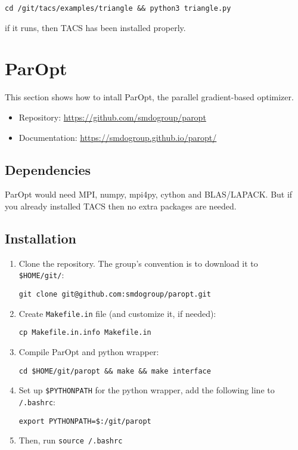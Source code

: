 \documentclass{article}
\begin{document}
\texttt{cd \texttildelow/git/tacs/examples/triangle \&\& python3 triangle.py}

if it runs, then TACS has been installed properly.

\section{ParOpt}

This section shows how to intall ParOpt, the parallel gradient-based optimizer.

\begin{itemize}
    \item Repository: \href{https://github.com/smdogroup/paropt}{https://github.com/smdogroup/paropt}
    \item Documentation: \href{https://smdogroup.github.io/paropt/}{https://smdogroup.github.io/paropt/}
\end{itemize}

\subsection{Dependencies}

ParOpt would need MPI, numpy, mpi4py, cython and BLAS/LAPACK. But if you already
installed TACS then no extra packages are needed.

\subsection{Installation}

\begin{enumerate}

    \item Clone the repository. The group's convention is to download it to
    \texttt{\$HOME/git/}:

    \texttt{git clone git@github.com:smdogroup/paropt.git}

    \item Create \texttt{Makefile.in} file (and customize it, if needed):

    \texttt{cp Makefile.in.info Makefile.in}

    \item Compile ParOpt and python wrapper:

    \texttt{cd \$HOME/git/paropt \&\& make \&\& make interface}

    \item Set up \texttt{\$PYTHONPATH} for the python wrapper, add the following line to \texttt{\texttildelow/.bashrc}:

    \texttt{export PYTHONPATH=\$:\texttildelow/git/paropt}

    \item Then, run \texttt{source \texttildelow/.bashrc}

\end{enumerate}
\end{document}
